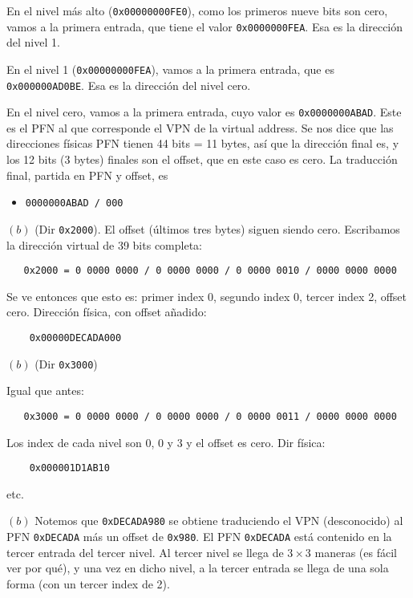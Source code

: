 \documentclass[12pt]{article}
\theoremstyle{definition}
\begin{document}
En el nivel más alto (\texttt{0x00000000FE0}), como los primeros nueve bits son
cero, vamos a la primera entrada, que tiene el valor \texttt{0x0000000FEA}. Esa
es la dirección del nivel 1.

En el nivel 1 (\texttt{0x00000000FEA}), vamos a la primera entrada, que es
\texttt{0x000000AD0BE}. Esa es la dirección del nivel cero. 

En el nivel cero, vamos a la primera entrada, cuyo valor es
\texttt{0x0000000ABAD}. Este es el PFN al que corresponde el VPN de la virtual
address. Se nos dice que las direcciones físicas PFN tienen 44 bits = 11 bytes,
así que la dirección final es, y los 12 bits (3 bytes) finales son el offset,
que en este caso es cero. La traducción final, partida en PFN y offset, es

\begin{itemize}
    \item \texttt{0000000ABAD / 000}
\end{itemize}

$(b)$ (Dir \texttt{0x2000}). El offset (últimos tres bytes) siguen siendo cero.
Escribamos la dirección virtual de 39 bits completa:

\begin{verbatim}
   0x2000 = 0 0000 0000 / 0 0000 0000 / 0 0000 0010 / 0000 0000 0000
\end{verbatim}

Se ve entonces que esto es: primer index 0, segundo index 0, tercer index 2,
offset cero. Dirección física, con offset añadido:

\begin{verbatim}
    0x00000DECADA000
\end{verbatim}

$(b)$ (Dir \texttt{0x3000})

Igual que antes: 

\begin{verbatim}
   0x3000 = 0 0000 0000 / 0 0000 0000 / 0 0000 0011 / 0000 0000 0000
\end{verbatim}

Los index de cada nivel son 0, 0 y 3 y  el offset es cero. Dir física:

\begin{verbatim}
    0x000001D1AB10
\end{verbatim}

etc.


$(b)$ Notemos que \texttt{0xDECADA980} se obtiene traduciendo el VPN
(desconocido) al PFN \texttt{0xDECADA} más un offset de \texttt{0x980}. El PFN
\texttt{0xDECADA} está contenido en la tercer entrada del tercer nivel. Al
tercer nivel se llega de $3 \times 3$ maneras (es fácil ver por qué), y una vez
en dicho nivel, a la tercer entrada se llega de una sola forma (con un tercer
index de 2).
\end{document}
